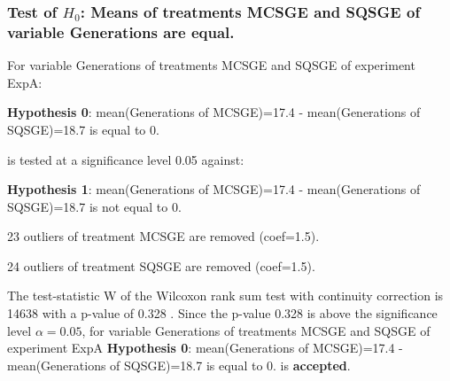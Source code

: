 \begin{frame}[t]
 \frametitle{Test of $H_{0}$: Means of treatments MCSGE and SQSGE of variable Generations are equal. }
 \scriptsize
 For variable Generations of treatments MCSGE and SQSGE of experiment ExpA:

\vspace{1mm}
{\bf Hypothesis 0}: mean(Generations of MCSGE)=17.4 - mean(Generations of SQSGE)=18.7 is equal to 0.


 \begin{center} is tested at a significance level 0.05 against: \end{center}

{\bf Hypothesis 1}: mean(Generations of MCSGE)=17.4 - mean(Generations of SQSGE)=18.7 is not equal to 0.
\vspace{1mm}
\vspace{1mm}

 23 outliers of treatment MCSGE are removed (coef=1.5).

 24 outliers of treatment SQSGE are removed (coef=1.5).
\vspace{1mm}
 
 The test-statistic W of the Wilcoxon rank sum test with continuity correction is 14638 with a p-value of 0.328 .
 Since the p-value 0.328 is above the significance level $\alpha= 0.05 $,
 for variable Generations of treatments MCSGE and SQSGE of experiment ExpA 
 {\bf Hypothesis 0}: mean(Generations of MCSGE)=17.4 - mean(Generations of SQSGE)=18.7 is equal to 0.
is {\bf accepted}.

 \end{frame}
